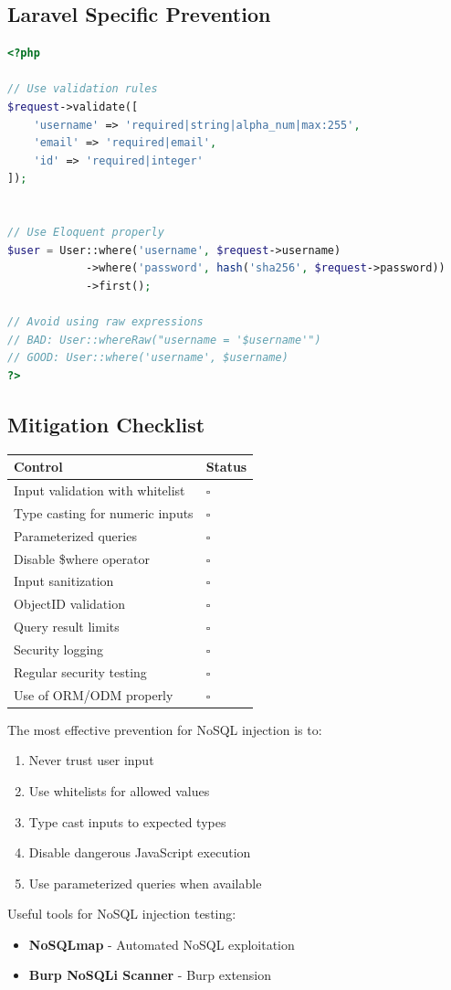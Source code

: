 \documentclass[12pt]{article}
\begin{document}
\subsection{Laravel Specific Prevention}

\begin{lstlisting}[language=PHP]
<?php

// Use validation rules
$request->validate([
    'username' => 'required|string|alpha_num|max:255',
    'email' => 'required|email',
    'id' => 'required|integer'
]);


// Use Eloquent properly
$user = User::where('username', $request->username)
            ->where('password', hash('sha256', $request->password))
            ->first();

// Avoid using raw expressions
// BAD: User::whereRaw("username = '$username'")
// GOOD: User::where('username', $username)
?>
\end{lstlisting}

\subsection{Mitigation Checklist}

\begin{longtable}{|p{5cm}|p{5cm}|}
\hline
\textbf{Control} & \textbf{Status} \\
\hline
Input validation with whitelist & $\square$ \\
\hline
Type casting for numeric inputs & $\square$ \\
\hline
Parameterized queries & $\square$ \\
\hline
Disable \$where operator & $\square$ \\
\hline
Input sanitization & $\square$ \\
\hline
ObjectID validation & $\square$ \\
\hline
Query result limits & $\square$ \\
\hline
Security logging & $\square$ \\
\hline
Regular security testing & $\square$ \\
\hline
Use of ORM/ODM properly & $\square$ \\
\hline
\end{longtable}

\begin{criticalbox}
The most effective prevention for NoSQL injection is to:
\begin{enumerate}
    \item Never trust user input
    \item Use whitelists for allowed values
    \item Type cast inputs to expected types
    \item Disable dangerous JavaScript execution
    \item Use parameterized queries when available
\end{enumerate}
\end{criticalbox}

\begin{infobox}
Useful tools for NoSQL injection testing:
\begin{itemize}
    \item \textbf{NoSQLmap} - Automated NoSQL exploitation
    \item \textbf{Burp NoSQLi Scanner} - Burp extension
\end{itemize}
\end{infobox}
\end{document}
